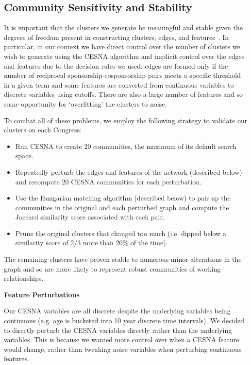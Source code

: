 \subsection{Community Sensitivity and Stability}

It is important that the clusters we generate be meaningful and stable given the
degrees of freedom present in constructing clusters, edges, and
features~\cite{Tzerpos}. In particular, in our context we have direct control
over the number of clusters we wish to generate using the CESNA algorithm and
implicit control over the edges and features due to the decision rules we used:
edges are formed only if the number of reciprocal sponsorship-cosponsorship
pairs meets a specific threshold in a given term and some features are converted
from continuous variables to discrete variables using cutoffs. There are also a
large number of features and so some opportunity for `overfitting' the clusters
to noise.

To combat all of these problems, we employ the following strategy to validate our clusters on each Congress:
\begin{itemize}
	\item Run CESNA to create 20 communities, the maximum of its default search space.
	\item Repeatedly perturb the edges and features of the network (described below) and recompute 20 CESNA communities for each perturbation.
	\item Use the Hungarian matching algorithm (described below) to pair up the communities in the original and each perturbed graph and compute the Jaccard similarity score associated with each pair.
	\item Prune the original clusters that changed too much (i.e. dipped below a similarity score of 2/3 more than 20\% of the time).
\end{itemize}

The remaining clusters have proven stable to numerous minor alterations in the
graph and so are more likely to represent robust communities of working
relationships.

\textbf{Feature Perturbations}

Our CESNA variables are all discrete despite the underlying variables being
continuous (e.g. age is bucketed into 10 year discrete time intervals). We
decided to directly perturb the CESNA variables directly rather than the
underlying variables. This is because we wanted more control over when a CESNA
feature would change, rather than tweaking noise variables when perturbing
continuous features.

